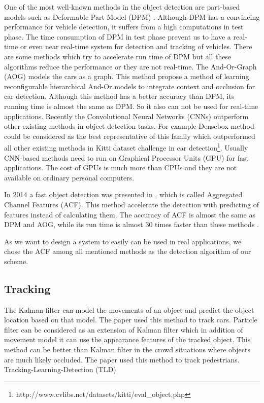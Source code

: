 \documentclass[conference]{IEEEtran}
\begin{document}
One of the most well-known methods in the object detection are part-based models such as Deformable Part Model (DPM) \cite{felzenszwalb2008discriminatively}. Although DPM has a convincing performance for vehicle detection, it suffers from a high computations in test phase. The time consumption of DPM in test phase prevent us to have a real-time or even near real-time system for detection and tracking of vehicles. There are some methods which try to accelerate run time of DPM \cite{} but all these algorithms reduce the performance or they are not real-time.
The And-Or-Graph (AOG) \cite{li2014integrating} models the cars as a graph. This method propose a method of learning reconfigurable hierarchical
And-Or models to integrate context and occlusion for car detection. Although this method has a better accuracy than DPM, its running time is  almost the same as DPM. So it also can not be used for real-time applications. Recently the Convolutional Neural Networks (CNNs) outperform other existing methods in object detection tasks. For example Densebox method \cite{huang2015densebox} could be considered as the best representative of this family which outperformed all other existing methods in Kitti dataset challenge in car detection\footnote{http://www.cvlibs.net/datasets/kitti/eval\_object.php}. Usually CNN-based methods need to run on Graphical Processor Units (GPU) for fast applications. The cost of GPUs is much more than CPUs and they are not available on ordinary personal computers.

In 2014 a fast object detection was presented in \cite{dollar2014fast}, which is called Aggregated Channel Features (ACF). This method accelerate the detection with predicting of features instead of calculating them. The accuracy of ACF is almost the same as DPM and AOG, while its run time is almost 30 times faster than these methods \cite{dollar2014fast}. 

As we want to design a system to easily can be used in real applications, we chose the ACF among all mentioned methods as the detection algorithm of our scheme.

\subsection{Tracking}

The Kalman filter can model the movements of an object and predict the object location based on that model. The paper \cite{zhang2013method} used this method to track cars. Particle filter can be considered as an extension of Kalman filter which in addition of movement model it can use the appearance features of the tracked object. This method can be better than Kalman filter in the crowd situations  where objects are much likely occluded. The paper \cite{} used this method to track pedestrians. Tracking-Learning-Detection (TLD) \cite{kalal2012tracking}  
\end{document}

